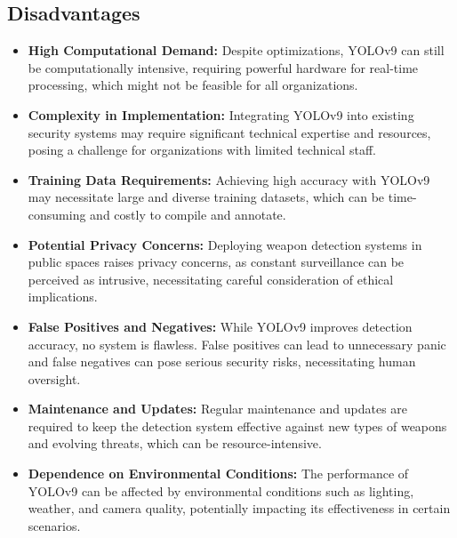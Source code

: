     \subsection{Disadvantages}
        \begin{itemize}
            \item \textbf{High Computational Demand:} Despite optimizations, YOLOv9 can still be computationally intensive, requiring powerful hardware for real-time processing, which might not be feasible for all organizations.
            \item \textbf{Complexity in Implementation:} Integrating YOLOv9 into existing security systems may require significant technical expertise and resources, posing a challenge for organizations with limited technical staff.
            \item \textbf{Training Data Requirements:} Achieving high accuracy with YOLOv9 may necessitate large and diverse training datasets, which can be time-consuming and costly to compile and annotate.
            \item \textbf{Potential Privacy Concerns:} Deploying weapon detection systems in public spaces raises privacy concerns, as constant surveillance can be perceived as intrusive, necessitating careful consideration of ethical implications.
            \item \textbf{False Positives and Negatives:} While YOLOv9 improves detection accuracy, no system is flawless. False positives can lead to unnecessary panic and false negatives can pose serious security risks, necessitating human oversight.
            \item \textbf{Maintenance and Updates:} Regular maintenance and updates are required to keep the detection system effective against new types of weapons and evolving threats, which can be resource-intensive.
            \item \textbf{Dependence on Environmental Conditions:} The performance of YOLOv9 can be affected by environmental conditions such as lighting, weather, and camera quality, potentially impacting its effectiveness in certain scenarios.
        \end{itemize}